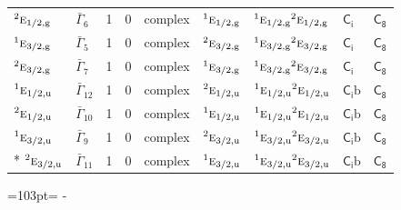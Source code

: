 \documentclass[10pt,a4paper]{article}
\newcommand{\needspace}[1]{\par\penalty-100\begingroup\dimen0=#1\relax\dimen2=\pagegoal
  \advance\dimen2-\pagetotal\ifdim\dimen0>\dimen2\relax\ifdim\dimen2>0pt\vfil\break\fi\fi
  \endgroup}
\numberwithin{equation}{section}
\newcommand{\grp}[1]{\mathsf{#1}}
\newcommand{\irr}[1]{\text{\normalfont\scshape #1}}
\newcommand{\conjpair}[1]{{}^{#1}}
\newcommand{\ptag}[1]{\mathrm{#1}}
\newcommand{\secondclass}{\mathrm{b}}
\begin{document}
{\begin{longtable}{@{}llrrlllll@{}}
$\conjpair{2}\irr{e}_{1/2,\ptag{g}}$ & $\bar{\Gamma}_{6}$ & 1 & $0$ & complex & $\conjpair{1}\irr{e}_{1/2,\ptag{g}}$ & $\conjpair{1}\irr{e}_{1/2,\ptag{g}}\conjpair{2}\irr{e}_{1/2,\ptag{g}}$ & \href{S2.pdf}{$\grp{C_{i}}$} & \href{../../../rotation/data/pdf/C8.pdf}{$\grp{C_{8}}$}\\
$\conjpair{1}\irr{e}_{3/2,\ptag{g}}$ & $\bar{\Gamma}_{5}$ & 1 & $0$ & complex & $\conjpair{2}\irr{e}_{3/2,\ptag{g}}$ & $\conjpair{1}\irr{e}_{3/2,\ptag{g}}\conjpair{2}\irr{e}_{3/2,\ptag{g}}$ & \href{S2.pdf}{$\grp{C_{i}}$} & \href{../../../rotation/data/pdf/C8.pdf}{$\grp{C_{8}}$}\\
$\conjpair{2}\irr{e}_{3/2,\ptag{g}}$ & $\bar{\Gamma}_{7}$ & 1 & $0$ & complex & $\conjpair{1}\irr{e}_{3/2,\ptag{g}}$ & $\conjpair{1}\irr{e}_{3/2,\ptag{g}}\conjpair{2}\irr{e}_{3/2,\ptag{g}}$ & \href{S2.pdf}{$\grp{C_{i}}$} & \href{../../../rotation/data/pdf/C8.pdf}{$\grp{C_{8}}$}\\
$\conjpair{1}\irr{e}_{1/2,\ptag{u}}$ & $\bar{\Gamma}_{12}$ & 1 & $0$ & complex & $\conjpair{2}\irr{e}_{1/2,\ptag{u}}$ & $\conjpair{1}\irr{e}_{1/2,\ptag{u}}\conjpair{2}\irr{e}_{1/2,\ptag{u}}$ & \href{S2b.pdf}{$\grp{C_{i}}\secondclass$} & \href{../../../rotation/data/pdf/C8.pdf}{$\grp{C_{8}}$}\\
$\conjpair{2}\irr{e}_{1/2,\ptag{u}}$ & $\bar{\Gamma}_{10}$ & 1 & $0$ & complex & $\conjpair{1}\irr{e}_{1/2,\ptag{u}}$ & $\conjpair{1}\irr{e}_{1/2,\ptag{u}}\conjpair{2}\irr{e}_{1/2,\ptag{u}}$ & \href{S2b.pdf}{$\grp{C_{i}}\secondclass$} & \href{../../../rotation/data/pdf/C8.pdf}{$\grp{C_{8}}$}\\
$\conjpair{1}\irr{e}_{3/2,\ptag{u}}$ & $\bar{\Gamma}_{9}$ & 1 & $0$ & complex & $\conjpair{2}\irr{e}_{3/2,\ptag{u}}$ & $\conjpair{1}\irr{e}_{3/2,\ptag{u}}\conjpair{2}\irr{e}_{3/2,\ptag{u}}$ & \href{S2b.pdf}{$\grp{C_{i}}\secondclass$} & \href{../../../rotation/data/pdf/C8.pdf}{$\grp{C_{8}}$}\\*
$\conjpair{2}\irr{e}_{3/2,\ptag{u}}$ & $\bar{\Gamma}_{11}$ & 1 & $0$ & complex & $\conjpair{1}\irr{e}_{3/2,\ptag{u}}$ & $\conjpair{1}\irr{e}_{3/2,\ptag{u}}\conjpair{2}\irr{e}_{3/2,\ptag{u}}$ & \href{S2b.pdf}{$\grp{C_{i}}\secondclass$} & \href{../../../rotation/data/pdf/C8.pdf}{$\grp{C_{8}}$}\\
\bottomrule\end{longtable}}
\needspace{103pt}
\end{document}
